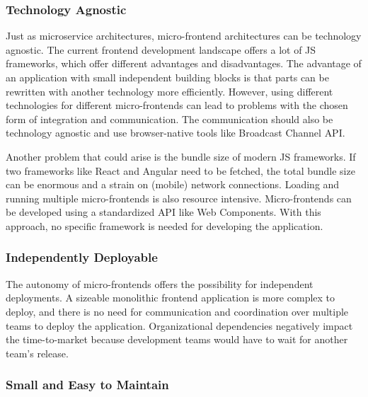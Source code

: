 \subsubsection{Technology Agnostic}\label{subsubsection:background:micro-frontend-technology-agnostic}

Just as microservice architectures, micro-frontend architectures can be technology agnostic. The current frontend development landscape offers a lot of \ac{JS} frameworks, which offer different advantages and disadvantages. The advantage of an application with small independent building blocks is that parts can be rewritten with another technology more efficiently. \cite[14-16]{book:2020:geers:background:micro-frontends:micro-frontends-in-action} However, using different technologies for different micro-frontends can lead to problems with the chosen form of integration and communication. The communication should also be technology agnostic and use browser-native tools like Broadcast Channel \ac{API}.

\bigskip

\noindent Another problem that could arise is the bundle size of modern \ac{JS} frameworks. If two frameworks like React and Angular need to be fetched, the total bundle size can be enormous and a strain on (mobile) network connections. Loading and running multiple micro-frontends is also resource intensive. Micro-frontends can be developed using a standardized \ac{API} like Web Components. With this approach, no specific framework is needed for developing the application. \cite{book:2020:geers:background:micro-frontends:micro-frontends-in-action}

\subsubsection{Independently Deployable}\label{subsubsection:background:micro-frontend-independent-deployable}

The autonomy of micro-frontends offers the possibility for independent deployments. A sizeable monolithic frontend application is more complex to deploy, and there is no need for communication and coordination over multiple teams to deploy the application. Organizational dependencies negatively impact the time-to-market because development teams would have to wait for another team's release. \cite[12]{book:2020:geers:background:micro-frontends:micro-frontends-in-action}

\subsubsection{Small and Easy to Maintain}\label{subsubsection:background:micro-frontend-small-and-easy-to-maintain}

